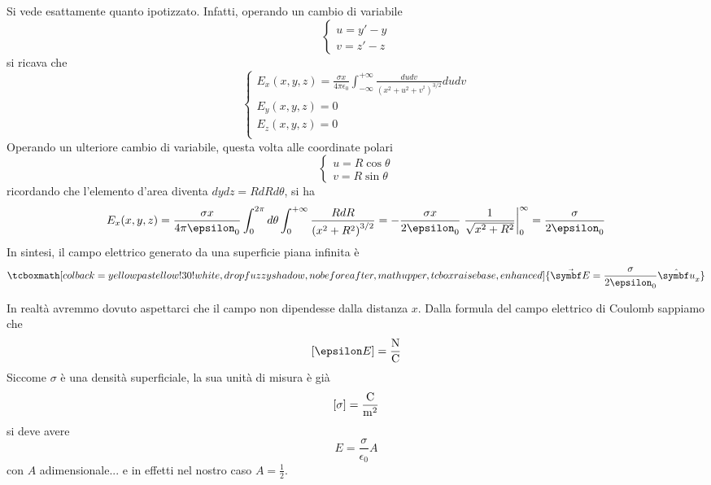 Si vede esattamente quanto ipotizzato. Infatti, operando un cambio di variabile
\begin{equation*}
	\begin{cases}
		u=y'-y\\
		v=z'-z
	\end{cases}
\end{equation*}
si ricava che
\begin{equation*}
	\begin{cases}
		\displaystyle E_x(x,y,z)=\frac{\sigma x}{4\pi\epsilon_0}\int_{-\infty}^{+\infty}\frac{dudv}{\left(x^2+u^2+v^^2\right)^{3/2}}dudv\\
		E_y(x,y,z)=0\\
		E_z(x,y,z)=0\\
	\end{cases}
\end{equation*}
Operando un ulteriore cambio di variabile, questa volta alle coordinate polari
\begin{equation*}
		\begin{cases}
		u=R\cos\theta\\
		v=R\sin\theta
	\end{cases}
\end{equation*}
ricordando che l'elemento d'area diventa $dydz=RdRd\theta$, si ha
\begin{equation*}
	E_x(x,y,z)=\frac{\sigma x}{4\pi\epsilon_0}\int_{0}^{2\pi}d\theta\int_{0}^{+\infty}\frac{RdR}{\left(x^2+R^2\right)^{3/2}}=-\frac{\sigma x}{2\epsilon_0}\eval{\frac{1}{\sqrt{x^2+R^2}}}_{0}^{\infty}=\frac{\sigma}{2\epsilon_0}
\end{equation*}
In sintesi, il campo elettrico generato da una superficie piana infinita è
\begin{equation}
	\tcboxmath[colback=yellowpastellow!30!white,drop fuzzy shadow, nobeforeafter, math upper, tcbox raise base, enhanced]{\vba{E}=\frac{\sigma}{2\epsilon_0}\vbh{u}_x}
\end{equation}
\begin{observe}
	In realtà avremmo dovuto aspettarci che il campo non dipendesse dalla distanza $x$. Dalla formula del campo elettrico di Coulomb sappiamo che
	\begin{equation*}
		\left[\epsilon E\right]=\unit[per-mode = fraction]{\newton\per\coulomb}
	\end{equation*}
	Siccome $\sigma$ è una densità superficiale, la sua unità di misura è già
	\begin{equation*}
		\left[\sigma\right]=\unit[per-mode = fraction]{\coulomb\per\square\meter}
	\end{equation*}
	si deve avere
	\begin{equation*}
		E=\frac{\sigma}{\epsilon_0}A
	\end{equation*}
con $A$ adimensionale... e in effetti nel nostro caso $A=\frac{1}{2}$.
\end{observe}
